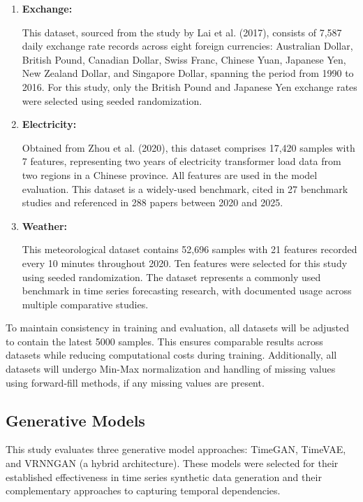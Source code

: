 \documentclass{article}
\begin{document}
\begin{enumerate}
    \item \textbf{Exchange:} 
    
    This dataset, sourced from the study by Lai et al. (2017), consists of 7,587 daily exchange rate records across eight foreign currencies: Australian Dollar, British Pound, Canadian Dollar, Swiss Franc, Chinese Yuan, Japanese Yen, New Zealand Dollar, and Singapore Dollar, spanning the period from 1990 to 2016. For this study, only the British Pound and Japanese Yen exchange rates were selected using seeded randomization.

    \item \textbf{Electricity:} 
    
    Obtained from Zhou et al. (2020), this dataset comprises 17,420 samples with 7 features, representing two years of electricity transformer load data from two regions in a Chinese province. All features are used in the model evaluation. This dataset is a widely-used benchmark, cited in 27 benchmark studies and referenced in 288 papers between 2020 and 2025.

    \item \textbf{Weather:} 

    This meteorological dataset contains 52,696 samples with 21 features recorded every 10 minutes throughout 2020. Ten features were selected for this study using seeded randomization. The dataset represents a commonly used benchmark in time series forecasting research, with documented usage across multiple comparative studies.

\end{enumerate}

To maintain consistency in training and evaluation, all datasets will be adjusted to contain the latest 5000 samples. This ensures comparable results across datasets while reducing computational costs during training. Additionally, all datasets will undergo Min-Max normalization and handling of missing values using forward-fill methods, if any missing values are present.

\subsection{Generative Models}
This study evaluates three generative model approaches: TimeGAN, TimeVAE, and VRNNGAN (a hybrid architecture). These models were selected for their established effectiveness in time series synthetic data generation and their complementary approaches to capturing temporal dependencies.
\end{document}
